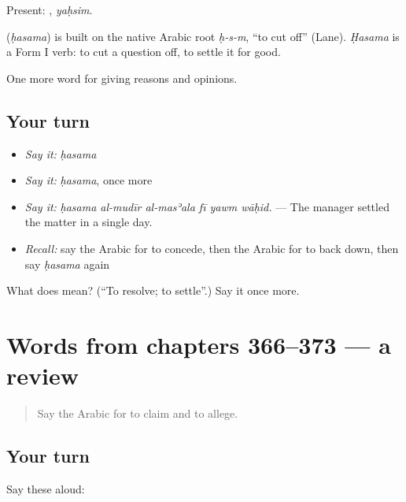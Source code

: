 Present: , \emph{yaḥsim}.

\begin{cousinweb}
\textbf{} (\emph{ḥasama}) is built on the native Arabic root \emph{ḥ-s-m}, \textquotedblleft{}to cut off\textquotedblright{} (Lane). \emph{Ḥasama} is a Form I verb: to cut a question off, to settle it for good.
\end{cousinweb}

\begin{grammarlens}[title={What you've built}]
One more word for giving reasons and opinions.
\end{grammarlens}

\subsection*{Your turn}
\begin{itemize}
\raggedright
  \item \emph{Say it:} \emph{ḥasama}
  \item \emph{Say it:} \emph{ḥasama}, once more
  \item \emph{Say it:} \emph{ḥasama al-mudīr al-masʾala fī yawm wāḥid.} — The manager settled the matter in a single day.
  \item \emph{Recall:} say the Arabic for to concede, then the Arabic for to back down, then say \emph{ḥasama} again
\end{itemize}

\begin{tcolorbox}[breakable,colback=teal!4,colframe=teal!35!black,title={Before you move on}]
What does  mean? (\textquotedblleft{}To resolve; to settle\textquotedblright{}.) Say it once more.
\end{tcolorbox}
\section[(dialogue)]{Words from chapters 366–373 — a review}

\label{lesson:AR-R373-review-366-373}



\begin{quote}
Say the Arabic for to claim and to allege.
\end{quote}

\subsection*{Your turn}
Say these aloud:

